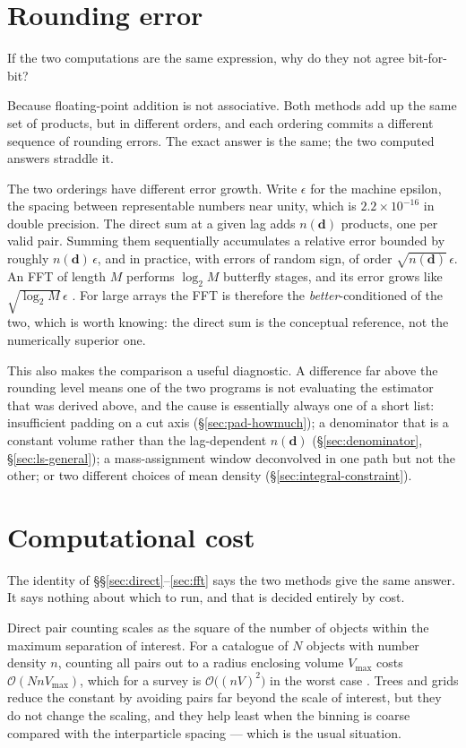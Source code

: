\documentclass[12pt]{article}
\newcommand{\bd}{\mathbf{d}}
\begin{document}
\section{Rounding error}\label{sec:roundoff}

If the two computations are the same expression, why do they not agree
bit-for-bit?

Because floating-point addition is not associative.  Both methods add up the
same set of products, but in different orders, and each ordering commits a
different sequence of rounding errors.  The exact answer is the same; the two
computed answers straddle it.

The two orderings have different error growth.  Write $\epsilon$ for the
machine epsilon, the spacing between representable numbers near unity, which
is $2.2\times10^{-16}$ in double precision.  The direct sum at a given lag adds
$n(\bd)$ products, one per valid pair.  Summing them sequentially
accumulates a relative error bounded by roughly $n(\bd)\,\epsilon$, and
in practice, with errors of random sign, of order
$\sqrt{n(\bd)}\,\epsilon$.  An FFT
of length $M$ performs $\log_2 M$ butterfly stages, and its error grows like
$\sqrt{\log_2 M}\,\epsilon$ \citep{Frigo2005}.  For large arrays the FFT is
therefore the \emph{better}-conditioned of the two, which is worth knowing:
the direct sum is the conceptual reference, not the numerically superior one.

This also makes the comparison a useful diagnostic.  A difference far above
the rounding level means one of the two programs is not evaluating the
estimator that was derived above, and the cause is essentially always one of
a short list: insufficient padding on a cut axis
(\S\ref{sec:pad-howmuch}); a denominator that is a constant volume rather
than the lag-dependent $n(\bd)$ (\S\ref{sec:denominator},
\S\ref{sec:ls-general}); a mass-assignment window deconvolved in one path but
not the other; or two different choices of mean density
(\S\ref{sec:integral-constraint}).

\section{Computational cost}\label{sec:cost}

The identity of \S\S\ref{sec:direct}--\ref{sec:fft} says the two methods give
the same answer.  It says nothing about which to run, and that is decided
entirely by cost.

Direct pair counting scales as the square of the number of objects within the
maximum separation of interest.  For a catalogue of $N$ objects with number
density $n$, counting all pairs out to a radius enclosing volume $V_{\max}$
costs $\mathcal{O}(N n V_{\max})$, which for a survey is
$\mathcal{O}\big((nV)^2\big)$ in the worst case \citep{Slepian2016}.  Trees
and grids reduce the constant by avoiding pairs far beyond the scale of
interest, but they do not change the scaling, and they help least when the
binning is coarse compared with the interparticle spacing --- which is the
usual situation.
\end{document}
